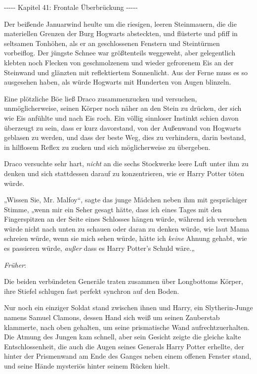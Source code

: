 

\hypertarget{frontale-uxfcberbruxfcckung}{%

-\/-\/-\/-\/- Kapitel 41: Frontale Überbrückung -\/-\/-\/-\/-

Der beißende Januarwind heulte um die riesigen, leeren Steinmauern, die die materiellen Grenzen der Burg Hogwarts absteckten, und flüsterte und pfiff in seltsamen Tonhöhen, als er an geschlossenen Fenstern und Steintürmen vorbeiflog. Der jüngste Schnee war größtenteils weggeweht, aber gelegentlich klebten noch Flecken von geschmolzenem und wieder gefrorenem Eis an der Steinwand und glänzten mit reflektiertem Sonnenlicht. Aus der Ferne muss es so ausgesehen haben, als würde Hogwarts mit Hunderten von Augen blinzeln.

Eine plötzliche Böe ließ Draco zusammenzucken und versuchen, unmöglicherweise, seinen Körper noch näher an den Stein zu drücken, der sich wie Eis anfühlte und nach Eis roch. Ein völlig sinnloser Instinkt schien davon überzeugt zu sein, dass er kurz davorstand, von der Außenwand von Hogwarts geblasen zu werden, und dass der beste Weg, dies zu verhindern, darin bestand, in hilflosem Reflex zu zucken und sich möglicherweise zu übergeben.

Draco versuchte sehr hart, \emph{nicht} an die sechs Stockwerke leere Luft unter ihm zu denken und sich stattdessen darauf zu konzentrieren, wie er Harry Potter töten würde.

„Wissen Sie, Mr. Malfoy“, sagte das junge Mädchen neben ihm mit gesprächiger Stimme, „wenn mir ein Seher gesagt hätte, dass ich eines Tages mit den Fingerspitzen an der Seite eines Schlosses hängen würde, während ich versuchen würde nicht nach unten zu schauen oder daran zu denken würde, wie laut Mama schreien würde, wenn sie mich sehen würde, hätte ich \emph{keine} Ahnung gehabt, wie es passieren würde, \emph{außer} dass es Harry Potter's Schuld wäre.„

\emph{Früher}:

Die beiden verbündeten Generäle traten zusammen über Longbottoms Körper, ihre Stiefel schlugen fast perfekt synchron auf den Boden.

Nur noch ein einziger Soldat stand zwischen ihnen und Harry, ein Slytherin-Junge namens Samuel Clamons, dessen Hand sich weiß um seinen Zauberstab klammerte, nach oben gehalten, um seine prismatische Wand aufrechtzuerhalten. Die Atmung des Jungen kam schnell, aber sein Gesicht zeigte die gleiche kalte Entschlossenheit, die auch die Augen seines Generals Harry Potter erhellte, der hinter der Prismenwand am Ende des Ganges neben einem offenen Fenster stand, und seine Hände mysteriös hinter seinem Rücken hielt.

}
